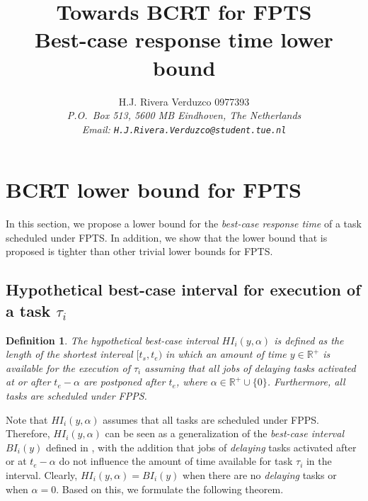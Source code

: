 \documentclass[fleqn]{article}
\title{\sf Towards BCRT for FPTS \\	
			Best-case response time lower bound}
\author{{\sf H.J. Rivera Verduzco 0977393}\\
{\footnotesize\sl P.O.~Box 513, 5600 MB Eindhoven, The Netherlands}\\
{\footnotesize \sl Email: \tt H.J.Rivera.Verduzco@student.tue.nl}}
\newtheorem{definition}{Definition}
\begin{document}
\maketitle



\section{BCRT lower bound for FPTS}
In this section, we propose a lower bound for the \textit{best-case response time} of a task scheduled under FPTS. In addition, we show that the lower bound that is proposed is tighter than other trivial lower bounds for FPTS.

\subsection{Hypothetical best-case interval for execution of a task $\tau_i$}
\begin{definition} \label{def:hi}
The \textit{hypothetical best-case interval} $HI_i(y,\alpha)$ is defined as the length of the shortest interval $[t_s,t_e)$ in which an amount of time $y \in \mathbb{R}^+$ is available for the execution of $\tau_i$ assuming that all jobs of delaying tasks activated at or after $t_e-\alpha$ are postponed after $t_e$, where $\alpha \in \mathbb{R^+} \cup \{0\}$. Furthermore, all tasks are scheduled under FPPS.
\end{definition}

Note that $HI_i(y,\alpha)$ assumes that all tasks are scheduled under FPPS. Therefore, $HI_i(y,\alpha)$ can be seen as a generalization of the \textit{best-case interval} $BI_i(y)$ defined in \cite{BLM13}, with the addition that jobs of \textit{delaying} tasks activated after or at $t_e-\alpha$ do not influence the amount of time available for task $\tau_i$ in the interval.  Clearly, $HI_i(y,\alpha) = BI_i(y)$ when there are no \textit{delaying} tasks or when $\alpha = 0$. Based on this, we formulate the following theorem. 

\end{document}
